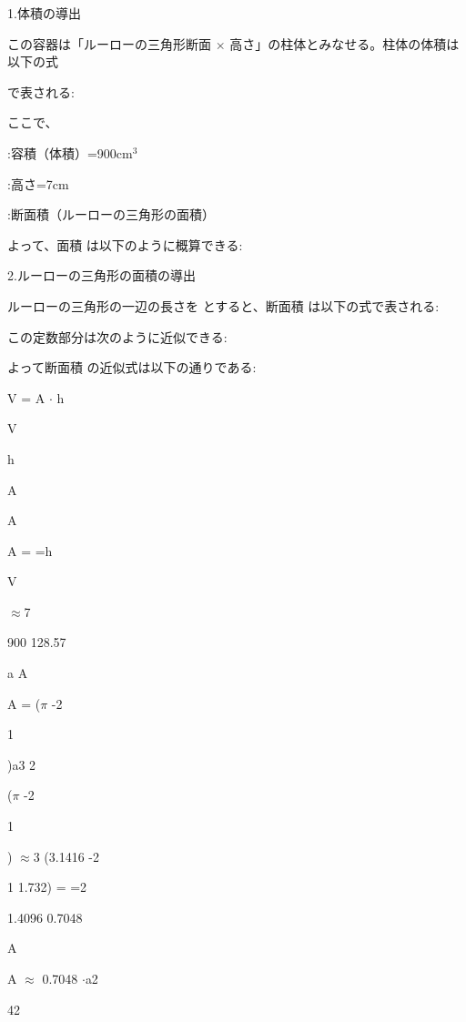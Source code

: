 1.体積の導出\par
この容器は「ルーローの三⾓形断⾯ $\times$ ⾼さ」の柱体とみなせる。柱体の体積は以下の式\par
で表される:\par
ここで、\par
:容積（体積）=900cm$^{3}$\par
:⾼さ=7cm\par
:断⾯積（ルーローの三⾓形の⾯積）\par
よって、⾯積 は以下のように概算できる:\par
2.ルーローの三⾓形の⾯積の導出\par
ルーローの三⾓形の⼀辺の長さを とすると、断⾯積 は以下の式で表される:\par
この定数部分は次のように近似できる:\par
よって断⾯積 の近似式は以下の通りである:\par
V = A $\cdot$ h\par
V\par
h\par
A\par
A\par
A =  =h\par
V\par
$\approx$7\par
900 128.57\par
a A\par
A =  ($\pi$ -2\par
1\par
)a3 2\par
($\pi$ -2\par
1\par
) $\approx$3  (3.1416 -2\par
1 1.732) =  =2\par
1.4096 0.7048\par
A\par
A $\approx$ 0.7048 $\cdot$a2\par
42\par

